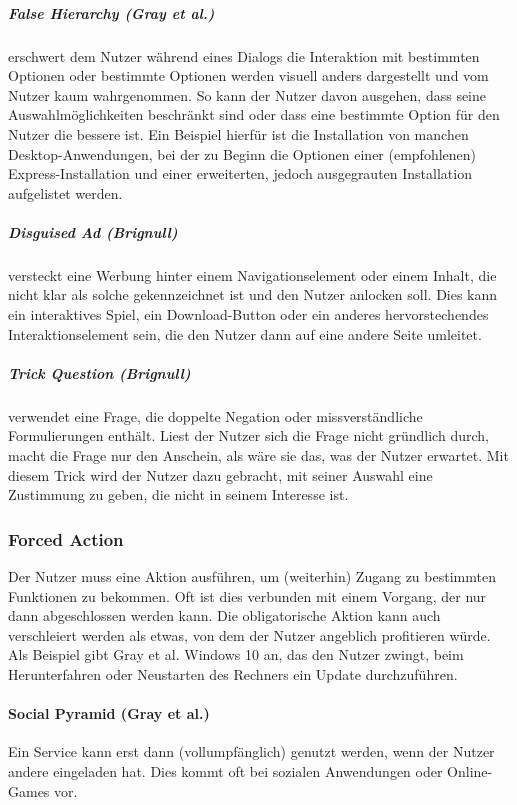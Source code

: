 \documentclass[a4paper]{article}
\begin{document}
\subparagraph{False Hierarchy (Gray et al.)}
\label{subpara:false_hierarchy}
erschwert dem Nutzer während eines Dialogs die Interaktion mit bestimmten Optionen oder bestimmte Optionen werden visuell anders dargestellt und vom Nutzer kaum wahrgenommen. So kann der Nutzer davon ausgehen, dass seine Auswahlmöglichkeiten beschränkt sind oder dass eine bestimmte Option für den Nutzer die bessere ist. Ein Beispiel hierfür ist die Installation von manchen Desktop-Anwendungen, bei der zu Beginn die Optionen einer (empfohlenen) Express-Installation und einer erweiterten, jedoch ausgegrauten Installation aufgelistet werden.

\subparagraph{Disguised Ad (Brignull)}
\label{subpara:disguised_ad}
versteckt eine Werbung hinter einem Navigationselement oder einem Inhalt, die nicht klar als solche gekennzeichnet ist und den Nutzer anlocken soll.
Dies kann ein interaktives Spiel, ein Download-Button oder ein anderes hervorstechendes Interaktionselement sein, die den Nutzer dann auf eine andere Seite umleitet.

\subparagraph{Trick Question (Brignull)}
\label{subpara:trick_question}
verwendet eine Frage, die doppelte Negation oder missverständliche Formulierungen enthält. Liest der Nutzer sich die Frage nicht gründlich durch, macht die Frage nur den Anschein, als wäre sie das, was der Nutzer erwartet. Mit diesem Trick wird der Nutzer dazu gebracht, mit seiner Auswahl eine Zustimmung zu geben, die nicht in seinem Interesse ist. 

\subsubsection{Forced Action}
\label{sssec:forced_action}
Der Nutzer muss eine Aktion ausführen, um (weiterhin) Zugang zu bestimmten Funktionen zu bekommen. Oft ist dies verbunden mit einem Vorgang, der nur dann abgeschlossen werden kann. Die obligatorische Aktion kann auch verschleiert werden als etwas, von dem der Nutzer angeblich profitieren würde. 
Als Beispiel gibt Gray et al. \cite{gray} Windows 10 an, das den Nutzer zwingt, beim Herunterfahren oder Neustarten des Rechners ein Update durchzuführen.  

\paragraph{Social Pyramid (Gray et al.)}
\label{para:social_pyramid}
Ein Service kann erst dann (vollumpfänglich) genutzt werden, wenn der Nutzer andere eingeladen hat. Dies kommt oft bei sozialen Anwendungen oder Online-Games vor. 
\end{document}
